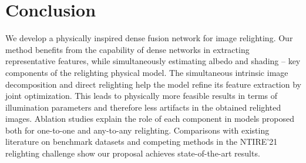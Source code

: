 \documentclass[final]{cvpr}
\newcommand{\smallsqueezeup}{\vspace{-2mm}}
\begin{document}
\section{Conclusion}\smallsqueezeup 
\noindent We develop a physically inspired dense fusion network
for image relighting. Our method benefits from the capability
of dense networks in extracting representative features, while simultaneously estimating albedo and shading
– key components of the relighting physical model.
The simultaneous intrinsic image decomposition and direct
relighting help the model refine its feature extraction
by joint optimization. This leads to physically more feasible
results in terms of illumination parameters and therefore
less artifacts in the obtained relighted images. Ablation
studies explain the role of each component in models
proposed both for one-to-one and any-to-any relighting.
Comparisons with existing literature on benchmark datasets
and competing methods in the NTIRE’21 relighting challenge
show our proposal achieves state-of-the-art results.

{\small


}
\end{document}

